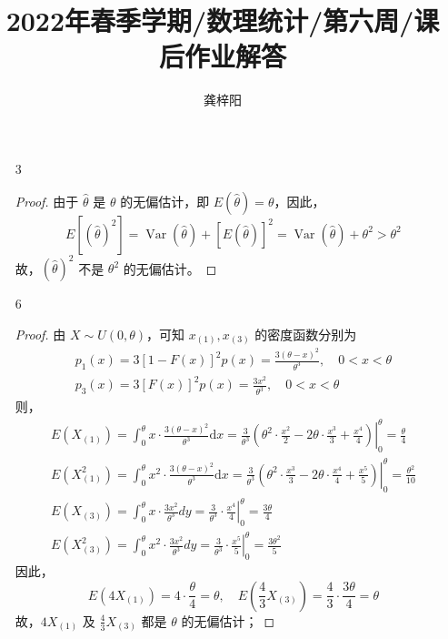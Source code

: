 \documentclass[normal,cn]{elegantnote}
\title{2022年春季学期/数理统计/第六周/课后作业解答}
\author{龚梓阳}
\date{\zhtoday}
\begin{document}
\maketitle
\begin{enumerate}
    \item[3]
        \begin{proof}
            由于 $\hat{\theta}$ 是 $\theta$ 的无偏估计，即 $E(\hat{\theta})=\theta$，因此，
            \begin{equation*}
                E\left[(\hat{\theta})^{2}\right]=\operatorname{Var}(\hat{\theta})+[E(\hat{\theta})]^{2}=\operatorname{Var}(\hat{\theta})+\theta^{2}>\theta^{2}
            \end{equation*}
            故，$(\hat{\theta})^{2}$ 不是 $\theta^{2}$ 的无偏估计。
        \end{proof}
    \item[6]
        \begin{proof}
            由 $X\sim U(0,\theta)$，可知 $x_{(1)},x_{(3)}$ 的密度函数分别为
            \begin{gather*}
                p_{1}(x)=3[1-F(x)]^{2}p(x)=\frac{3(\theta-x)^{2}}{\theta^{3}},\quad 0<x<\theta \\
                p_{3}(x)=3[F(x)]^{2}p(x)=\frac{3x^{2}}{\theta^{3}},\quad 0<x<\theta
            \end{gather*}
            则，
            \begin{gather*}
                E\left(X_{(1)}\right)=\int_{0}^{\theta}x\cdot\frac{3(\theta-x)^{2}}{\theta^{3}}\mathrm{d}x=\left.\frac{3}{\theta^{3}}\left(\theta^{2}\cdot\frac{x^{2}}{2}-2\theta\cdot\frac{x^{3}}{3}+\frac{x^{4}}{4}\right)\right|_{0}^{\theta}=\frac{\theta}{4}\\
                E\left(X_{(1)}^{2}\right)=\int_{0}^{\theta} x^{2}\cdot\frac{3(\theta-x)^{2}}{\theta^{3}}\mathrm{d}x=\left.\frac{3}{\theta^{3}}\left(\theta^{2}\cdot\frac{x^{3}}{3}-2\theta\cdot\frac{x^{4}}{4}+\frac{x^{5}}{5}\right)\right|_{0}^{\theta}=\frac{\theta^{2}}{10}\\
                E\left(X_{(3)}\right)=\int_{0}^{\theta}x\cdot\frac{3x^{2}}{\theta^{3}}dy=\left.\frac{3}{\theta^{3}}\cdot\frac{x^{4}}{4}\right|_{0}^{\theta}=\frac{3\theta}{4} \\
                E\left(X_{(3)}^{2}\right)=\int_{0}^{\theta}x^{2}\cdot\frac{3x^{2}}{\theta^{3}}dy=\left.\frac{3}{\theta^{3}}\cdot\frac{x^{5}}{5}\right|_{0}^{\theta}=\frac{3\theta^{2}}{5}
            \end{gather*}
            因此，
            \begin{equation*}
                E\left(4X_{(1)}\right)=4\cdot\frac{\theta}{4}=\theta,\quad E\left(\frac{4}{3}X_{(3)}\right)=\frac{4}{3}\cdot\frac{3\theta}{4}=\theta
            \end{equation*}
            故，$4X_{(1)}$ 及 $\frac{4}{3}X_{(3)}$ 都是 $\theta$ 的无偏估计；


\end{proof}
\end{enumerate}
\end{document}
